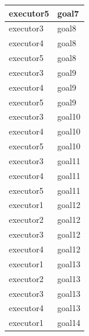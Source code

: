 \documentclass[12pt]{article}
\begin{document}
\begin{table}[H]
\begin{tabular}{|l|l|}
executor5 & goal7 \\ \hline
executor3 & goal8 \\ \hline
executor4 & goal8 \\ \hline
executor5 & goal8 \\ \hline
executor3 & goal9 \\ \hline
executor4 & goal9 \\ \hline
executor5 & goal9 \\ \hline
executor3 & goal10 \\ \hline
executor4 & goal10 \\ \hline
executor5 & goal10 \\ \hline
executor3 & goal11 \\ \hline
executor4 & goal11 \\ \hline
executor5 & goal11 \\ \hline
executor1 & goal12 \\ \hline
executor2 & goal12 \\ \hline
executor3 & goal12 \\ \hline
executor4 & goal12 \\ \hline
executor1 & goal13 \\ \hline
executor2 & goal13 \\ \hline
executor3 & goal13 \\ \hline
executor4 & goal13 \\ \hline
executor1 & goal14 \\ \hline
\end{tabular}
\end{table}
\end{document}
